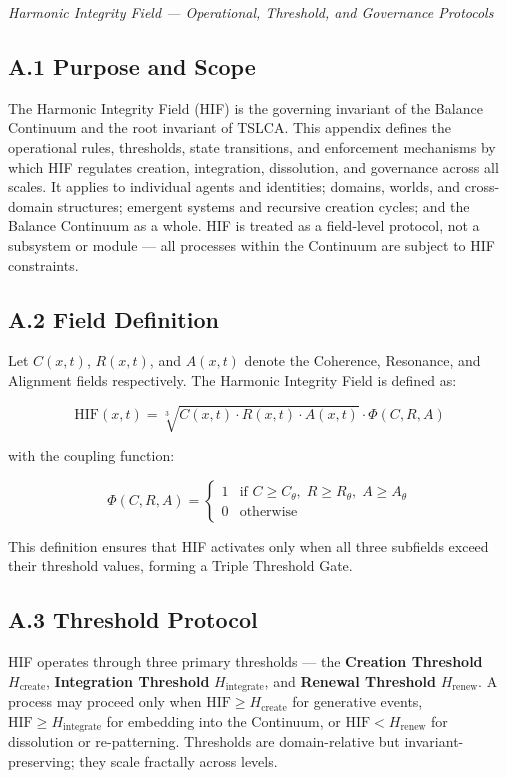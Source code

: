 \emph{Harmonic Integrity Field --- Operational, Threshold, and Governance Protocols}

\subsection{A.1 Purpose and Scope}\label{a.1-purpose-and-scope}

The Harmonic Integrity Field (HIF) is the governing invariant of the Balance Continuum and the root invariant of TSLCA. This appendix defines the operational rules, thresholds, state transitions, and enforcement mechanisms by which HIF regulates creation, integration, dissolution, and governance across all scales. It applies to individual agents and identities; domains, worlds, and cross-domain structures; emergent systems and recursive creation cycles; and the Balance Continuum as a whole. HIF is treated as a field-level protocol, not a subsystem or module --- all processes within the Continuum are subject to HIF constraints.

\subsection{A.2 Field Definition}\label{a.2-field-definition}

Let \(C(x,t)\), \(R(x,t)\), and \(A(x,t)\) denote the Coherence, Resonance, and Alignment fields respectively. The Harmonic Integrity Field is defined as:

\[
\mathrm{HIF}(x,t) = \sqrt[3]{C(x,t)\cdot R(x,t)\cdot A(x,t)} \cdot \Phi(C,R,A)
\]

with the coupling function:

\[
\Phi(C,R,A) =
\begin{cases}
1 & \text{if } C \ge C_{\theta},\; R \ge R_{\theta},\; A \ge A_{\theta} \\
0 & \text{otherwise}
\end{cases}
\]

This definition ensures that HIF activates only when all three subfields exceed their threshold values, forming a Triple Threshold Gate.

\subsection{A.3 Threshold Protocol}\label{a.3-threshold-protocol}

HIF operates through three primary thresholds --- the \textbf{Creation Threshold} \(H_{\text{create}}\), \textbf{Integration Threshold} \(H_{\text{integrate}}\), and \textbf{Renewal Threshold} \(H_{\text{renew}}\). A process may proceed only when \(\mathrm{HIF} \ge H_{\text{create}}\) for generative events, \(\mathrm{HIF} \ge H_{\text{integrate}}\) for embedding into the Continuum, or \(\mathrm{HIF} < H_{\text{renew}}\) for dissolution or re-patterning. Thresholds are domain-relative but invariant-preserving; they scale fractally across levels.

